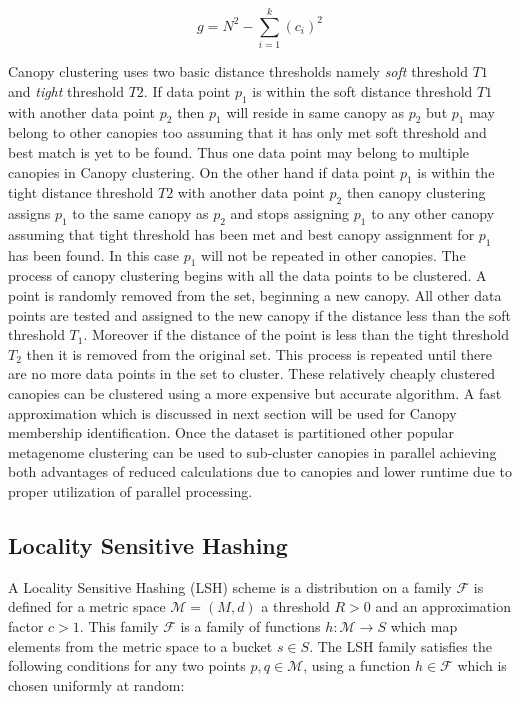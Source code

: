 \documentclass[10pt, conference, compsocconf]{IEEEtran}
\begin{document}
\begin{equation}
g=N^2-\sum_{i=1}^{k}(c_i)^2
\end{equation} 

Canopy clustering uses two basic distance thresholds namely \textit{soft} threshold $T1$ and \textit{tight} threshold $T2$. If data point $p_1$ is within the soft distance threshold $T1$ with another data point $p_2$ then $p_1$ will reside in same canopy as $p_2$ but $p_1$ may belong to other canopies too assuming that it has only met soft threshold and best match is yet to be found. Thus one data point may belong to multiple canopies in Canopy clustering. On the other hand if data point $p_1$ is within the tight distance threshold $T2$ with another data point $p_2$ then canopy clustering assigns $p_1$ to the same canopy as $p_2$ and stops assigning $p_1$ to any other canopy assuming that tight threshold has been met and best canopy assignment for $p_1$ has been found. In this case $p_1$ will not be repeated in other canopies.
The process of canopy clustering begins with all the data points to be clustered. A point is randomly removed from the set, beginning a new canopy. All other data points are tested and assigned to the new canopy if the distance less than the soft threshold ${\displaystyle T_{1}}$. Moreover if the distance of the point is less than the tight threshold ${\displaystyle T_{2}}$ then it is removed from the original set. This process is repeated until there are no more data points in the set to cluster. These relatively cheaply clustered canopies can be clustered using a more expensive but accurate algorithm. A fast approximation which is discussed in next section will be used for Canopy membership identification. Once the dataset is partitioned other popular metagenome clustering can be used to sub-cluster canopies in parallel achieving both advantages of reduced calculations due to canopies and lower runtime due to proper utilization of parallel processing. 


\subsection{Locality Sensitive Hashing}

A Locality Sensitive Hashing (LSH) \cite{MARLshRef1}\cite{MARLshRef2}\cite{MARLshRef3} scheme is a distribution on a family ${\displaystyle {\mathcal {F}}}$ is defined for a metric space ${\displaystyle {\mathcal{M}}=(M,d)}$ a threshold ${\displaystyle R>0}$ and an approximation factor ${\displaystyle c>1}$. This family ${\displaystyle {\mathcal {F}}}$ is a family of functions ${\displaystyle h:{\mathcal {M}}\to S}$ which map elements from the metric space to a bucket ${\displaystyle s\in S}$. The LSH family satisfies the following conditions for any two points ${\displaystyle p,q\in {\mathcal {M}}}$, using a function ${\displaystyle h\in {\mathcal {F}}}$ which is chosen uniformly at random:
\end{document}
